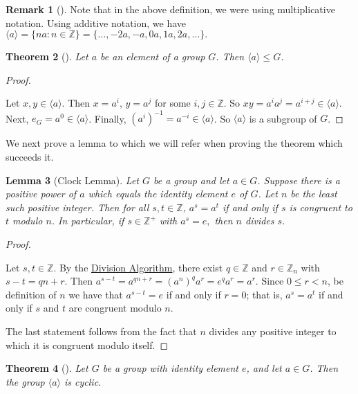 \documentclass[10pt,]{book}
\theoremstyle{plain}
\newtheorem{theorem}{Theorem}[section]
\newtheorem{lemma}[theorem]{Lemma}
\theoremstyle{definition}
\theoremstyle{definition}
\newtheorem{remark}[theorem]{Remark}
\theoremstyle{definition}
\theoremstyle{definition}
\numberwithin{equation}{section}
\def\Z{\mathbb{Z}}
\newcommand{\lt}{<}
\begin{document}
\begin{remark}[]\label{remark-21}
Note that in the above definition, we were using multiplicative notation. Using additive notation, we have \(\langle a\rangle =\{na:n\in \Z\}=\{\ldots, -2a, -a, 0a, 1a, 2a, \ldots\}.\)%
\end{remark}
\begin{theorem}[{}]\label{theorem-23}
Let \(a\) be an element of a group \(G\). Then \(\langle a\rangle \leq G\).%
\end{theorem}
\begin{proof}\hypertarget{proof-22}{}
Let \(x,y\in \langle a\rangle\). Then \(x=a^i\), \(y=a^j\) for some \(i,j\in \Z\). So \(xy=a^ia^j=a^{i+j}\in \langle a\rangle\). Next, \(e_G=a^0\in \langle a \rangle\). Finally, \((a^i)^{-1}=a^{-i}\in \langle a \rangle\). So \(\langle a\rangle\) is a subgroup of \(G\).%
\end{proof}
We next prove a lemma to which we will refer when proving the theorem which succeeds it.%
\begin{lemma}[{Clock Lemma}]\label{clock}
Let \(G\) be a group and let \(a \in G\). Suppose there is a positive power of \(a\) which equals the identity element \(e\) of \(G\). Let \(n\) be the least such positive integer. Then for all \(s,t\in \Z\), \(a^s=a^t\) if and only if \(s\) is congruent to \(t\) modulo \(n\). In particular, if \(s\in \Z^+\) with \(a^s=e,\) then \(n\) divides \(s\).%
\end{lemma}
\begin{proof}\hypertarget{proof-23}{}
Let \(s,t\in \Z\). By the \hyperref[divalg]{Division Algorithm}, there exist \(q\in \Z\) and \(r\in \Z_n\) with \(s-t=qn+r\). Then \(a^{s-t}=a^{qn+r}=(a^n)^qa^r=e^qa^r=a^r\). Since \(0\leq r\lt n\), be definition of \(n\) we have that \(a^{s-t}=e\) if and only if \(r=0\); that is, \(a^s=a^t\) if and only if \(s\) and \(t\) are congruent modulo \(n\).%
\par
The last statement follows from the fact that \(n\) divides any positive integer to which it is congruent modulo itself.%
\end{proof}
\begin{theorem}[{}]\label{theorem-24}
Let \(G\) be a group with identity element \(e\), and let \(a\in G\). Then the group \(\langle a\rangle\) is cyclic.%
\end{theorem}
\end{document}
